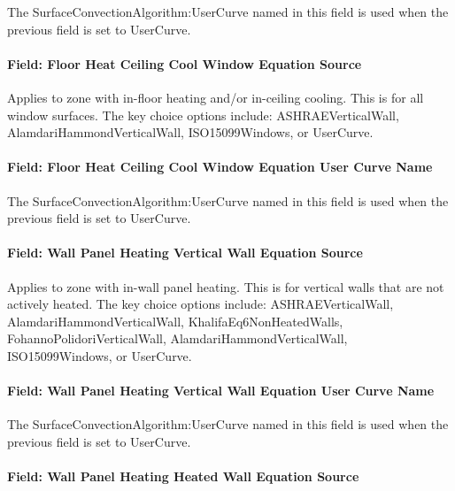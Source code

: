 The SurfaceConvectionAlgorithm:UserCurve named in this field is used when the previous field is set to UserCurve.

\paragraph{Field: Floor Heat Ceiling Cool Window Equation Source}\label{field-floor-heat-ceiling-cool-window-equation-source}

Applies to zone with in-floor heating and/or in-ceiling cooling. This is for all window surfaces. The key choice options include: ASHRAEVerticalWall, AlamdariHammondVerticalWall, ISO15099Windows, or UserCurve.

\paragraph{Field: Floor Heat Ceiling Cool Window Equation User Curve Name}\label{field-floor-heat-ceiling-cool-window-equation-user-curve-name}

The SurfaceConvectionAlgorithm:UserCurve named in this field is used when the previous field is set to UserCurve.

\paragraph{Field: Wall Panel Heating Vertical Wall Equation Source}\label{field-wall-panel-heating-vertical-wall-equation-source}

Applies to zone with in-wall panel heating. This is for vertical walls that are not actively heated. The key choice options include: ASHRAEVerticalWall, AlamdariHammondVerticalWall, KhalifaEq6NonHeatedWalls, FohannoPolidoriVerticalWall, AlamdariHammondVerticalWall, ISO15099Windows, or UserCurve.

\paragraph{Field: Wall Panel Heating Vertical Wall Equation User Curve Name}\label{field-wall-panel-heating-vertical-wall-equation-user-curve-name}

The SurfaceConvectionAlgorithm:UserCurve named in this field is used when the previous field is set to UserCurve.

\paragraph{Field: Wall Panel Heating Heated Wall Equation Source}\label{field-wall-panel-heating-heated-wall-equation-source}

